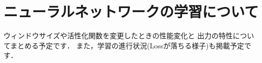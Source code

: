 \chapter{ニューラルネットワークの学習について}

ウィンドウサイズや活性化関数を変更したときの性能変化と
出力の特性についてまとめる予定です．
また，学習の進行状況(Lossが落ちる様子)も掲載予定です．